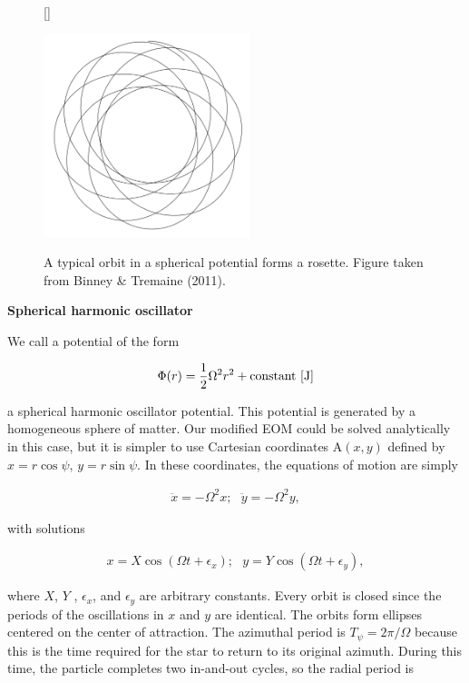 \documentclass[a4paper,10pt]{article}
\begin{document}
\begin{figure}[H]
    [\FBwidth]
    {\caption{\footnotesize{A typical orbit in a spherical potential forms a rosette. Figure taken from Binney \& Tremaine (2011).}}
    \label{fig:rosette}}
    {\includegraphics[width=6cm]{figures/rosette.png}}
\end{figure}

{\noindent}\textbf{Spherical harmonic oscillator}

{\noindent}We call a potential of the form

\begin{align*}
    \Phi(r) = \frac{1}{2}\Omega^2r^2 + {\rm constant} ~ [\rm J]
\end{align*}

{\noindent}a spherical harmonic oscillator potential. This potential is generated by a homogeneous sphere of matter. Our modified EOM could be solved analytically in this case, but it is simpler to use Cartesian coordinates A$(x,y)$ defined by $x=r\cos\psi$, $y=r\sin\psi$. In these coordinates, the equations of motion are simply

\begin{align*}
    \ddot{x} = -\Omega^2x; ~~~ \ddot{y} = -\Omega^2y,
\end{align*}

{\noindent}with solutions

\begin{align*}
    x = X\cos(\Omega t+\epsilon_x); ~~~ y = Y\cos(\Omega t+\epsilon_y),
\end{align*}

{\noindent}where $X$, $Y$ , $\epsilon_x$, and $\epsilon_y$ are arbitrary constants. Every orbit is closed since the periods of the oscillations in $x$ and $y$ are identical. The orbits form ellipses centered on the center of attraction. The azimuthal period is $T_\psi=2\pi/\Omega$ because this is the time required for the star to return to its original azimuth. During this time, the particle completes two in-and-out cycles, so the radial period is
\end{document}
